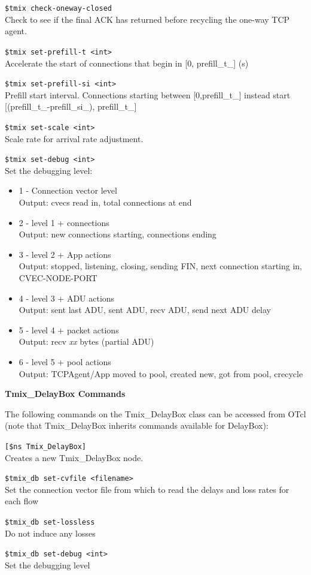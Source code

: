 {\tt \$tmix check-oneway-closed}\\
Check to see if the final ACK has returned before recycling the one-way 
TCP agent.
 
{\tt \$tmix set-prefill-t <int>}\\
Accelerate the start of connections that begin in {[}0, prefill\_t\_{]} (s)

{\tt \$tmix set-prefill-si <int>}\\
Prefill start interval. Connections starting between {}[0,prefill\_t\_{]} 
instead start {[}(prefill\_t\_-prefill\_si\_), prefill\_t\_{]}

{\tt \$tmix set-scale <int>}\\
Scale rate for arrival rate adjustment.

{\tt \$tmix set-debug <int>}\\
Set the debugging level:
\begin{itemize}
\item{1 - Connection vector level\\
  Output: cvecs read in, total connections at end}
\item{2 - level 1 + connections\\
  Output: new connections starting, connections ending}
\item{3 - level 2 + App actions\\
  Output: stopped, listening, closing, sending FIN, next connection 
starting in, CVEC-NODE-PORT}
\item{4 - level 3 + ADU actions\\
  Output: sent last ADU, sent ADU, recv ADU, send next ADU delay}
\item{5 - level 4 + packet actions\\
  Output: recv \emph{xx} bytes (partial ADU)}
\item{6 - level 5 + pool actions\\
  Output: TCPAgent/App moved to pool, created new, got from pool, crecycle}
\end{itemize}

{\bf Tmix\_DelayBox Commands}

The following commands on the Tmix\_DelayBox class can be accessed
from OTcl (note that Tmix\_DelayBox inherits commands available for DelayBox):

{\tt [\$ns Tmix\_DelayBox]}\\
Creates a new Tmix\_DelayBox node.

{\tt \$tmix\_db set-cvfile <filename>}\\
Set the connection vector file from which to read the delays and loss rates for
each flow

{\tt \$tmix\_db set-lossless}\\
Do not induce any losses 

{\tt \$tmix\_db set-debug <int>}\\
Set the debugging level
